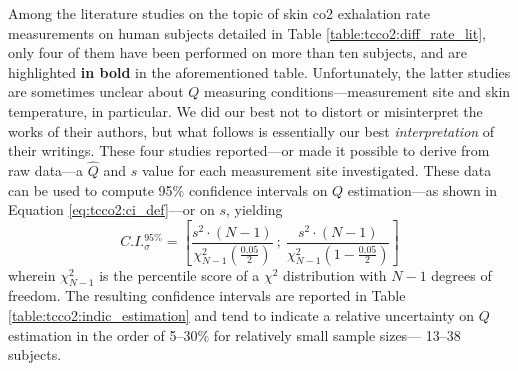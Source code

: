 Among the literature studies on the topic of skin \gls{co2} exhalation rate measurements on human subjects detailed in Table \ref{table:tcco2:diff_rate_lit}, only four of them have been performed on more than ten subjects, and are highlighted \textbf{in bold} in the aforementioned table. Unfortunately, the latter studies are sometimes unclear about $Q$ measuring conditions---measurement site and skin temperature, in particular. We did our best not to distort or misinterpret the works of their authors, but what follows is essentially our best \emph{interpretation} of their writings. These four studies reported---or made it possible to derive from raw data---a $\widehat{Q}$ and $s$ value for each measurement site investigated. These data can be used to compute 95\% confidence intervals on $Q$ estimation---as shown in Equation \ref{eq:tcco2:ci_def}---or on $s$, yielding \cite[Chap.~4]{ambrosius2007topics}
\begin{equation}\label{eq:tcco2:sigma_ci}
	C.I._{\sigma}^{95\%} = \left[ \frac{s^2 \cdot (N-1)}{\chi^2_{N-1}\left(\frac{0.05}{2}\right)} \ ; \ \frac{s^2 \cdot (N-1)}{\chi^2_{N-1}\left(1 - \frac{0.05}{2}\right)} \right]
\end{equation}
wherein $\chi^2_{N-1}$ is the percentile score of a $\chi^2$ distribution with $N-1$ degrees of freedom. The resulting confidence intervals are reported in Table \ref{table:tcco2:indic_estimation} and tend to indicate a relative uncertainty on $Q$ estimation in the order of 5--30\% for relatively small sample sizes---\ie{} 13--38 subjects.

